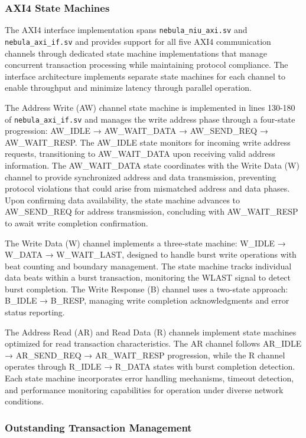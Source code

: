 \documentclass[12pt,letterpaper]{article}
\begin{document}
\subsubsection{AXI4 State Machines}

The AXI4 interface implementation spans \texttt{nebula\_niu\_axi.sv} and \texttt{nebula\_axi\_if.sv} and provides support for all five AXI4 communication channels through dedicated state machine implementations that manage concurrent transaction processing while maintaining protocol compliance. The interface architecture implements separate state machines for each channel to enable throughput and minimize latency through parallel operation.

The Address Write (AW) channel state machine is implemented in lines 130-180 of \texttt{nebula\_axi\_if.sv} and manages the write address phase through a four-state progression: AW\_IDLE → AW\_WAIT\_DATA → AW\_SEND\_REQ → AW\_WAIT\_RESP. The AW\_IDLE state monitors for incoming write address requests, transitioning to AW\_WAIT\_DATA upon receiving valid address information. The AW\_WAIT\_DATA state coordinates with the Write Data (W) channel to provide synchronized address and data transmission, preventing protocol violations that could arise from mismatched address and data phases. Upon confirming data availability, the state machine advances to AW\_SEND\_REQ for address transmission, concluding with AW\_WAIT\_RESP to await write completion confirmation.

The Write Data (W) channel implements a three-state machine: W\_IDLE → W\_DATA → W\_WAIT\_LAST, designed to handle burst write operations with beat counting and boundary management. The state machine tracks individual data beats within a burst transaction, monitoring the WLAST signal to detect burst completion. The Write Response (B) channel uses a two-state approach: B\_IDLE → B\_RESP, managing write completion acknowledgments and error status reporting.

The Address Read (AR) and Read Data (R) channels implement state machines optimized for read transaction characteristics. The AR channel follows AR\_IDLE → AR\_SEND\_REQ → AR\_WAIT\_RESP progression, while the R channel operates through R\_IDLE → R\_DATA states with burst completion detection. Each state machine incorporates error handling mechanisms, timeout detection, and performance monitoring capabilities for operation under diverse network conditions.

\subsubsection{Outstanding Transaction Management}
\end{document}
